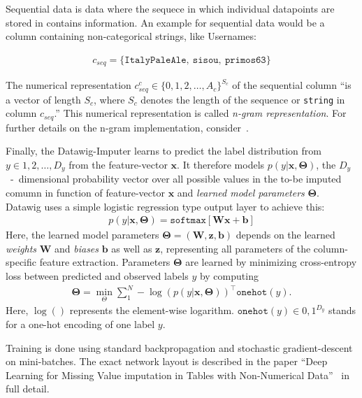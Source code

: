 Sequential data is data where the sequece in which individual datapoints are stored in contains information.
An example for sequential data would be a column containing non-categorical strings, like Usernames:

\begin{align}
    c_{seq} = \{ \texttt{ItalyPaleAle},~\texttt{sisou},~\texttt{primos63} \}
\end{align}

The numerical representation \( c_{seq}^{c} \in \{ 0, 1, 2, \dots, A_c \}^{S_c} \) of the sequential column ``is a vector of length \( S_c \), where \( S_c \) denotes the length of the sequence or \texttt{string} in column \( c_{seq} \).''\cite[p.2020]{BIE18}
This numerical representation is called \emph{n-gram representation}.
For further details on the n-gram implementation, consider~\cite[p.2020]{BIE18}.

Finally, the Datawig-Imputer learns to predict the label distribution from \( y \in {1, 2, \dots, D_y} \) from the feature-vector \( \mathbold{x} \).
It therefore models \( p(y|\mathbold{x},\mathbold{\Theta}) \), the \( D_y \)~-~dimensional probability vector over all possible values in the to-be imputed comumn in function of feature-vector \( \mathbold{x} \) and \emph{learned model parameters} \( \mathbold{\Theta} \).
Datawig uses a simple logistic regression type output layer to achieve this:
\begin{align}
    p(y|\mathbold{x},\mathbold{\Theta}) = \texttt{softmax}[\mathbold{Wx} + \mathbold{b}]
\end{align}
Here, the learned model parameters \( \mathbold{\Theta} = (\mathbold{W}, \mathbold{z}, \mathbold{b}) \) depends on the learned \emph{weights} \( \mathbold{W} \) and \emph{biases} \( \mathbold{b} \) as well as \( \mathbold{z} \), representing all parameters of the column-specific feature extraction.
Parameters \( \mathbold{\Theta} \) are learned by minimizing cross-entropy loss between predicted and observed labels \( y \) by computing
\begin{align}
    \mathbold{\Theta} = \min_{\Theta} \sum\nolimits_{1}^{N} - \log(p(y|\mathbold{x}, \mathbold{\Theta}))^\top \texttt{onehot}(y).
\end{align}
Here, \( \log() \) represents the element-wise logarithm.
\( \texttt{onehot}(y) \in {0, 1}^{D_y}\) stands for a one-hot encoding of one label \( y \).

Training is done using standard backpropagation and stochastic gradient-descent on mini-batches.
The exact network layout is described in the paper ``Deep Learning for Missing Value imputation in Tables with Non-Numerical Data''~\cite[p.2022]{BIE18} in full detail.


